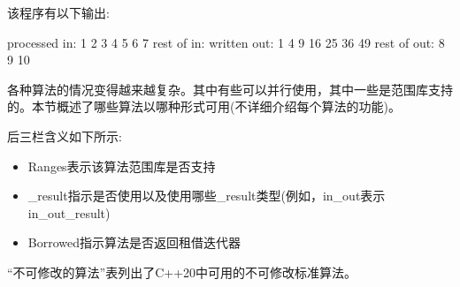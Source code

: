 该程序有以下输出:

\begin{shell}
processed in: 1 2 3 4 5 6 7
rest of in:
written out: 1 4 9 16 25 36 49
rest of out: 8 9 10
\end{shell}


各种算法的情况变得越来越复杂。其中有些可以并行使用，其中一些是范围库支持的。本节概述了哪些算法以哪种形式可用(不详细介绍每个算法的功能)。

后三栏含义如下所示:

\begin{itemize}
\item
Ranges表示该算法范围库是否支持

\item
\_result指示是否使用以及使用哪些\_result类型(例如，in\_out表示in\_out\_result)

\item
Borrowed指示算法是否返回租借迭代器
\end{itemize}

“不可修改的算法”表列出了C++20中可用的不可修改标准算法。


